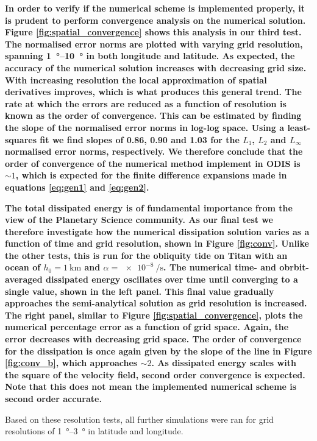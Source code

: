 \textbf{In order to verify if the numerical scheme is implemented properly, it is prudent to perform convergence analysis on the numerical solution. Figure \ref{fig:spatial_convergence} shows this analysis in our third test. The normalised error norms are plotted with varying grid resolution, spanning \SIrange{1}{10}{\degree} in both longitude and latitude. As expected, the accuracy of the numerical solution increases with decreasing grid size. With increasing resolution the local approximation of spatial derivatives improves, which is what produces this general trend. The rate at which the errors are reduced as a function of resolution is known as the order of convergence. This can be estimated by finding the slope of the normalised error norms in log-log space. Using a least-squares fit we find slopes of \num{0.86}, \num{0.90} and \num{1.03} for the $L_1$, $L_2$ and $L_{\infty}$ normalised error norms, respectively. We therefore conclude that the order of convergence of the numerical method implement in ODIS is $\sim 1$, which is expected for the finite difference expansions made in equations \ref{eq:gen1} and \ref{eq:gen2}.}

\textbf{The total dissipated energy is of fundamental importance from the view of the Planetary Science community. As our final test we therefore investigate how the numerical dissipation solution varies as a function of time and grid resolution, shown in Figure \ref{fig:conv}. Unlike the other tests, this is run for the obliquity tide on Titan with an ocean of $h_0 = \SI{1}{\kilo\metre}$ and $\alpha = \SI{e-8}{\per\second}$. The numerical time- and obrbit-averaged dissipated energy oscillates over time until converging to a single value, shown in the left panel. This final value gradually approaches the \citet{matsuyama2014tidal} semi-analytical solution as grid resolution is increased. The right panel, similar to Figure \ref{fig:spatial_convergence}, plots the numerical percentage error as a function of grid space. Again, the error decreases with decreasing grid space. The order of convergence for the dissipation is once again given by the slope of the line in Figure \ref{fig:conv_b}, which approaches $\sim 2$. As dissipated energy scales with the square of the velocity field, second order convergence is expected. Note that this does not mean the implemented numerical scheme is second order accurate. } 

Based on these resolution tests, all further simulations were ran for grid resolutions of \SIrange{1}{3}{\degree} in latitude and longitude.


